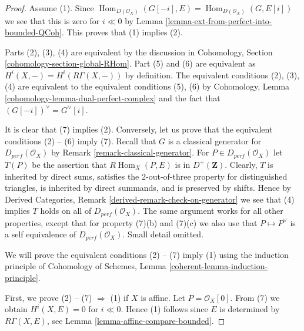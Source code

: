 \documentclass{stacks-project}
\theoremstyle{plain}
\theoremstyle{definition}
\theoremstyle{remark}
\numberwithin{equation}{subsection}
\def\Hom{\mathop{\mathrm{Hom}}\nolimits}
\begin{document}
\begin{proof}
Assume (1). Since
$\Hom_{D(\mathcal{O}_X)}(G[-i], E) = \Hom_{D(\mathcal{O}_X)}(G, E[i])$
we see that this is zero for $i \ll 0$ by
Lemma \ref{lemma-ext-from-perfect-into-bounded-QCoh}. This proves
that (1) implies (2).

\medskip\noindent
Parts (2), (3), (4) are equivalent by the discussion in
Cohomology, Section \ref{cohomology-section-global-RHom}.
Part (5) and (6) are equivalent as $H^i(X, -) = H^i(R\Gamma(X, -))$
by definition. The equivalent conditions (2), (3), (4) are
equivalent to the equivalent conditions (5), (6) by
Cohomology, Lemma \ref{cohomology-lemma-dual-perfect-complex}
and the fact that $(G[-i])^\vee = G^\vee[i]$.

\medskip\noindent
It is clear that (7) implies (2). Conversely, 
let us prove that the equivalent conditions (2) -- (6) imply (7).
Recall that $G$ is a  classical generator for $D_{perf}(\mathcal{O}_X)$ by
Remark \ref{remark-classical-generator}.
For $P \in D_{perf}(\mathcal{O}_X)$ let $T(P)$ be the assertion that
$R\Hom_X(P, E)$ is in $D^+(\mathbf{Z})$.
Clearly, $T$ is inherited by direct sums,
satisfies the 2-out-of-three property for distinguished
triangles, is inherited by direct summands, and is preserved by shifts.
Hence by Derived Categories, Remark \ref{derived-remark-check-on-generator}
we see that (4) implies $T$ holds on all of $D_{perf}(\mathcal{O}_X)$.
The same argument works for all other properties, except that for property
(7)(b) and (7)(c) we also use that $P \mapsto P^\vee$ is a self
equivalence of $D_{perf}(\mathcal{O}_X)$. Small detail omitted.

\medskip\noindent
We will prove the equivalent conditions (2) -- (7) imply (1)
using the induction principle of
Cohomology of Schemes, Lemma \ref{coherent-lemma-induction-principle}.

\medskip\noindent
First, we prove (2) -- (7) $\Rightarrow$ (1) if $X$ is affine.
Let $P = \mathcal{O}_X[0]$. From (7) we obtain $H^i (X, E) = 0$
for $i \ll 0$. Hence (1) follows since $E$ is
determined by $R\Gamma (X, E)$, see Lemma \ref{lemma-affine-compare-bounded}.


\end{proof}
\end{document}
